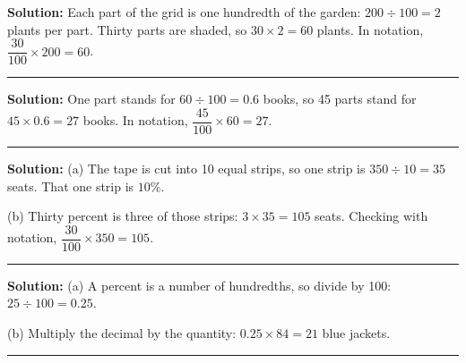 \documentclass[12pt]{article}
\begin{document}



\textbf{Solution:} Each part of the grid is one hundredth of the garden:
$200 \div 100 = 2$ plants per part. Thirty parts are shaded, so
$30 \times 2 = 60$ plants. In notation, $\dfrac{30}{100} \times 200 = 60$. 

\vspace{0.3cm}\noindent\rule{\linewidth}{0.2pt}\vspace{0.3cm}


\textbf{Solution:} One part stands for $60 \div 100 = 0.6$ books, so 45 parts
stand for $45 \times 0.6 = 27$ books. In notation,
$\dfrac{45}{100} \times 60 = 27$. 

\vspace{0.3cm}\noindent\rule{\linewidth}{0.2pt}\vspace{0.3cm}


\textbf{Solution:} (a) The tape is cut into 10 equal strips, so one strip is
$350 \div 10 = 35$ seats. That one strip is $10\%$. 

(b) Thirty percent is three of those strips: $3 \times 35 = 105$ seats.
Checking with notation, $\dfrac{30}{100} \times 350 = 105$. 

\vspace{0.3cm}\noindent\rule{\linewidth}{0.2pt}\vspace{0.3cm}


\textbf{Solution:} (a) A percent is a number of hundredths, so divide by 100:
$25 \div 100 = 0.25$. 

(b) Multiply the decimal by the quantity: $0.25 \times 84 = 21$ blue
jackets. 

\vspace{0.3cm}\noindent\rule{\linewidth}{0.2pt}\vspace{0.3cm}

\end{document}
